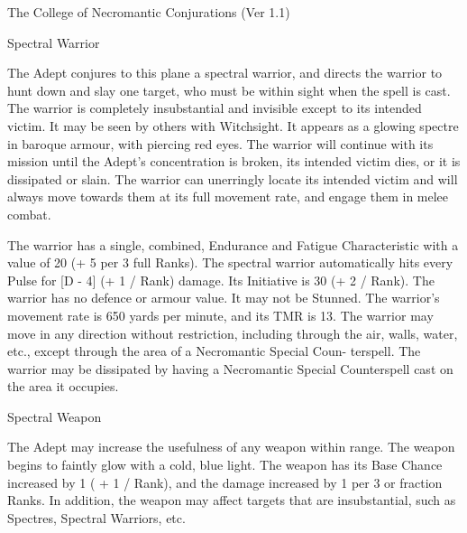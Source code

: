 \begin{Chapter}{The College of Necromantic Conjurations (Ver 1.1)}
\begin{spell}[S-12]{Spectral Warrior}

\begin{effects}
The Adept conjures to this plane a spectral warrior, and directs the
warrior to hunt down and slay one target, who must be within sight
when the spell is cast.  The warrior is completely insubstantial and
invisible except to its intended victim.  It may be seen by others
with Witchsight.  It appears as a glowing spectre in baroque armour,
with piercing red eyes.  The warrior will continue with its mission
until the Adept’s concentration is broken, its intended victim dies,
or it is dissipated or slain.  The warrior can unerringly locate its
intended victim and will always move towards them at its full movement
rate, and engage them in melee combat.

The warrior has a single, combined, Endurance and Fatigue
Characteristic with a value of 20 (+ 5 per 3 full Ranks).  The
spectral warrior automatically hits every Pulse for [D - 4] (+ 1 /
Rank) damage. Its Initiative is 30 (+ 2 / Rank). The warrior has no
defence or armour value. It may not be Stunned.  The warrior’s
movement rate is 650 yards per minute, and its TMR is 13.  The warrior
may move in any direction without restriction, including through the
air, walls, water, etc., except through the area of a Necromantic
Special Coun- terspell. The warrior may be dissipated by having a
Necromantic Special Counterspell cast on the area it occupies.

\end{effects}
\end{spell}

\begin{spell}[S-13]{Spectral Weapon}

\begin{effects}
The Adept may increase the usefulness of any weapon within range. The
weapon begins to faintly glow with a cold, blue light.  The weapon has
its Base Chance increased by 1 ( + 1 / Rank), and the damage increased
by 1 per 3 or fraction Ranks.  In addition, the weapon may affect
targets that are insubstantial, such as Spectres, Spectral Warriors,
etc.
\end{effects}
\end{spell}


\end{Chapter}
